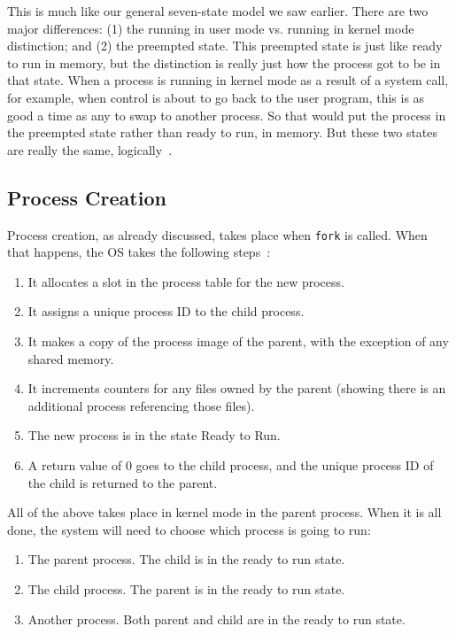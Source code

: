 This is much like our general seven-state model we saw earlier. There are two major differences: (1) the running in user mode vs. running in kernel mode distinction; and (2) the preempted state. This preempted state is just like ready to run in memory, but the distinction is really just how the process got to be in that state. When a process is running in kernel mode as a result of a system call, for example, when control is about to go back to the user program, this is as good a time as any to swap to another process. So that would put the process in the preempted state rather than ready to run, in memory. But these two states are really the same, logically~\cite{osi}. 

\subsection*{Process Creation}
Process creation, as already discussed, takes place when \texttt{fork} is called. When that happens, the OS takes the following steps~\cite{bach86}:

\begin{enumerate}
	\item It allocates a slot in the process table for the new process.
	\item It assigns a unique process ID to the child process.
	\item It makes a copy of the process image of the parent, with the exception of any shared memory.
	\item It increments counters for any files owned by the parent (showing there is an additional process referencing those files).
	\item The new process is in the state Ready to Run.
	\item A return value of 0 goes to the child process, and the unique process ID of the child is returned to the parent.
\end{enumerate}

All of the above takes place in kernel mode in the parent process. When it is all done, the system will need to choose which process is going to run: 

\begin{enumerate}
	\item The parent process. The child is in the ready to run state.
	\item The child process. The parent is in the ready to run state.
	\item Another process. Both parent and child are in the ready to run state.
\end{enumerate}

